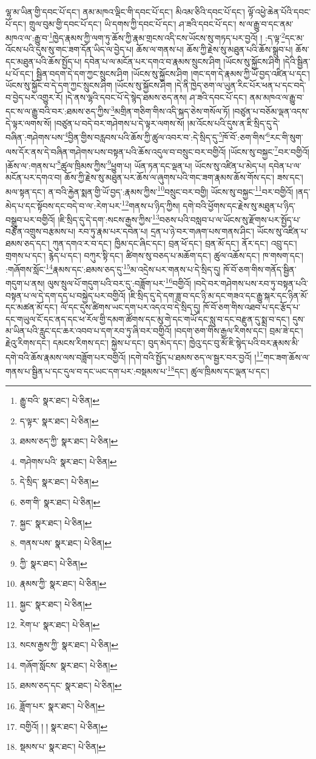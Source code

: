 ལྷ་མ་ཡིན་གྱི་དབང་པོ་དང་། ནམ་མཁའ་ལྡིང་གི་དབང་པོ་དང་། མིའམ་ཅིའི་དབང་པོ་དང་། ལྟོ་འཕྱེ་ཆེན་པོའི་དབང་པོ་དང་། གྲུལ་བུམ་གྱི་དབང་པོ་དང་། ཡི་དགས་ཀྱི་དབང་པོ་དང་། ཤ་ཟའི་དབང་པོ་དང་། ས་ལ་རྒྱུ་བ་དང་ནམ་མཁའ་ལ་:རྒྱུ་བ་\footnote{རྒྱུ་བའི་  སྣར་ཐང་།  པེ་ཅིན། }ཁྱེད་རྣམས་ཀྱི་ལག་ཏུ་ཆོས་ཀྱི་རྣམ་གྲངས་འདི་ངས་ཡོངས་སུ་གཏད་པར་བྱའོ། །
:ད་ལྟ་\footnote{ད་ལྟར་  སྣར་ཐང་།  པེ་ཅིན། }དང་མ་འོངས་པའི་དུས་སུ་གང་ཟག་དོན་ཡིད་ལ་བྱེད་པ། ཆོས་ལ་གནས་པ། ཆོས་ཀྱི་རྗེས་སུ་མཐུན་པའི་ཆོས་སྒྲུབ་པ། ཆོས་དང་མཐུན་པའི་ཆོས་སྤྱོད་པ། དབེན་པ་ལ་མངོན་པར་དགའ་བ་རྣམས་སྲུངས་ཤིག །ཡོངས་སུ་སྐྱོངས་ཤིག །དེའི་སྦྱིན་པ་པོ་དང་། སྦྱིན་བདག་དེ་དག་ཀྱང་སྲུངས་ཤིག །ཡོངས་སུ་སྐྱོངས་ཤིག །གང་དག་དེ་རྣམས་ཀྱི་ཡོ་བྱད་འཛིན་པ་དང་། ཡོངས་སུ་སྐྱོང་བ་དེ་དག་ཀྱང་སྲུངས་ཤིག །ཡོངས་སུ་སྐྱོངས་ཤིག །དེ་ནི་ཁྱེད་ཅག་ལ་ཡུན་རིང་པོར་ཕན་པ་དང་བདེ་བ་བྱེད་པར་འགྱུར་རོ། །དེ་ནས་ལྷའི་དབང་པོ་དེ་སྙེད་ཐམས་ཅད་ནས། ཤ་ཟའི་དབང་པོ་དང་། ནམ་མཁའ་ལ་རྒྱུ་བ་དང་ས་ལ་རྒྱུ་བའི་བར་:ཐམས་ཅད་ཀྱིས་\footnote{ཐམས་ཅད་ཀྱི་  སྣར་ཐང་།  པེ་ཅིན། }མགྲིན་གཅིག་གིས་འདི་སྐད་ཅེས་གསོལ་ཏོ། །བཙུན་པ་བཅོམ་ལྡན་འདས་དེ་ལྟར་ལགས་སོ། །བཙུན་པ་བདེ་བར་གཤེགས་པ་དེ་ལྟར་ལགས་སོ། །མ་འོངས་པའི་དུས་ན་ཇི་སྲིད་དུ་དེ་བཞིན་:གཤེགས་པས་\footnote{གཤེགས་པའི་  སྣར་ཐང་།  པེ་ཅིན། }བྱིན་གྱིས་བརླབས་པའི་ཆོས་ཀྱི་ཚུལ་འབར་བ་:དེ་སྲིད་དུ་\footnote{དེ་སྲིད་  སྣར་ཐང་།  པེ་ཅིན། }ཁོ་བོ་:ཅག་གིས་\footnote{ཅག་གི་  སྣར་ཐང་།  པེ་ཅིན། }རང་གི་སུག་ལས་དོར་ནས་དེ་བཞིན་གཤེགས་པས་བསྟན་པའི་ཆོས་འདུལ་བ་བསྲུང་བར་བགྱིའོ། །ཡོངས་སུ་བསྐྱང་\footnote{སྐྱང་  སྣར་ཐང་།  པེ་ཅིན། }བར་བགྱིའོ། །ཆོས་ལ་:གནས་པ་\footnote{གནས་པས་  སྣར་ཐང་།  པེ་ཅིན། }ཚུལ་ཁྲིམས་ཀྱིས་\footnote{ཀྱི་  སྣར་ཐང་།  པེ་ཅིན། }ཕྱུག་པ། ཡོན་ཏན་དང་ལྡན་པ། ཡོངས་སུ་འཛིན་པ་མེད་པ། དབེན་པ་ལ་མངོན་པར་དགའ་བ། ཆོས་ཀྱི་རྗེས་སུ་མཐུན་པར་ཆོས་ལ་ཞུགས་པའི་གང་ཟག་རྣམས་ཆོས་གོས་དང་། ཟས་དང་། མལ་སྟན་དང་། ན་བའི་རྐྱེན་སྨན་གྱི་ཡོ་བྱད་:རྣམས་ཀྱིས་\footnote{རྣམས་ཀྱི་  སྣར་ཐང་།  པེ་ཅིན། }བསྲུང་བར་བགྱི། ཡོངས་སུ་བསྐྱང་\footnote{སྐྱང་  སྣར་ཐང་།  པེ་ཅིན། }བར་བགྱིའོ། །ནད་མེད་པ་དང་སྟོབས་དང་བདེ་བ་ལ་:རེག་པར་\footnote{རེག་པ་  སྣར་ཐང་།  པེ་ཅིན། }གནས་པ་ཉིད་ཀྱིས། དགེ་བའི་ཕྱོགས་དང་རྗེས་སུ་མཐུན་པ་ཉིད་བསྒྲུབ་པར་བགྱིའོ། །ཇི་སྲིད་དུ་དེ་དག་:སངས་རྒྱས་ཀྱིས་\footnote{སངས་རྒྱས་ཀྱི་  སྣར་ཐང་།  པེ་ཅིན། }བཅས་པའི་བསླབ་པ་ལ་ཡོངས་སུ་རྫོགས་པར་སྤྱོད་པ་བརྩོན་འགྲུས་བརྩམས་པ། རབ་ཏུ་རྣམ་པར་དབེན་པ། དྲན་པ་ཉེ་བར་གཞག་པས་གནས་ཤིང་། ཡོངས་སུ་འཛིན་པ་ཐམས་ཅད་དང་། ཀུན་དགའ་ར་བ་དང་། ཁྱིམ་དང་ཞིང་དང་། བྲན་ཕོ་དང་། བྲན་མོ་དང་། ནོར་དང་། འབྲུ་དང་། གྲགས་པ་དང་། རྙེད་པ་དང་། བཀུར་སྟི་དང་། ཚིགས་སུ་བཅད་པ་མཆོག་དང་། ཚུལ་འཆོས་དང་། ཁ་གསག་དང་། :གཞོགས་སློང་\footnote{གཞོག་སློངས་  སྣར་ཐང་།  པེ་ཅིན། }རྣམས་དང་:ཐམས་ཅད་དུ་\footnote{ཐམས་ཅད་དང་  སྣར་ཐང་།  པེ་ཅིན། }མ་འདྲེས་པར་གནས་པ་དེ་སྲིད་དུ། ཁོ་བོ་ཅག་གིས་གནོད་སྦྱིན་གདུག་པ་ནས། ལུས་སྲུལ་པོ་གདུག་པའི་བར་དུ་:བཟློག་པར་\footnote{ཟློག་པར་  སྣར་ཐང་།  པེ་ཅིན། }བགྱིའོ། །བདེ་བར་གཤེགས་པས་རབ་ཏུ་བསྟན་པའི་བསྟན་པ་ལ་དེ་དག་དད་པ་བསྐྱེད་པར་བགྱིའོ། །ཇི་སྲིད་དུ་དེ་དག་ཟླ་བ་དང་ཉི་མ་དང་གཟའ་དང་རྒྱུ་སྐར་དང་ཉིན་མོ་དང་མཚན་མོ་དང་། ལོ་དང་དུས་ཚིགས་ཡང་དག་པར་འདའ་བ་དེ་སྲིད་དུ། ཁོ་བོ་ཅག་གིས་འཐབ་པ་དང་རྩོད་པ་དང་གཡུལ་ངོ་དང་ནད་དང་ཕ་རོལ་གྱི་དམག་ཚོགས་དང་མུ་གེ་དང་གཡོ་དང་སླུ་བ་དང་བརྫུན་དུ་སྨྲ་བ་དང་། དུས་མ་ཡིན་པའི་རླུང་དང་ཆར་འབབ་པ་དག་རབ་ཏུ་ཞི་བར་བགྱིའོ། །བདག་ཅག་གིས་རྒྱལ་རིགས་དང་། བྲམ་ཟེ་དང་། རྗེའུ་རིགས་དང་། དམངས་རིགས་དང་། སྐྱེས་པ་དང་། བུད་མེད་དང་། ཁྱེའུ་དང་བུ་མོ་ཇི་སྙེད་པའི་བར་རྣམས་མི་དགེ་བའི་ཆོས་རྣམས་ལས་བཟློག་པར་བགྱིའོ། །དགེ་བའི་སྤྱོད་པ་ཐམས་ཅད་ལ་སྦྱར་བར་བྱའོ། །\footnote{བགྱིའོ། ། །  སྣར་ཐང་།  པེ་ཅིན། }གང་ཟག་ཆོས་ལ་གནས་པ་སྦྱིན་པ་དང་དུལ་བ་དང་ཡང་དག་པར་:བསྡམས་པ་\footnote{སྡམས་པ་  སྣར་ཐང་།  པེ་ཅིན། }དང་། ཚུལ་ཁྲིམས་དང་ལྡན་པ་དང་། 